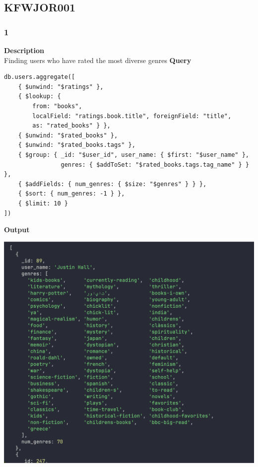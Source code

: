 \documentclass[11pt]{article}
\begin{document}
\subsection{KFWJOR001}
\label{sec:orgddd99c3}
\subsubsection{1}
\label{sec:orgbbf3a5b}
\textbf{Description}\\
Finding users who have rated the most diverse genres
\linebreak
\textbf{Query}
\begin{verbatim}
db.users.aggregate([
    { $unwind: "$ratings" },
    { $lookup: {
        from: "books",
        localField: "ratings.book.title", foreignField: "title",
        as: "rated_books" } },
    { $unwind: "$rated_books" },
    { $unwind: "$rated_books.tags" },
    { $group: { _id: "$user_id", user_name: { $first: "$user_name" },
                genres: { $addToSet: "$rated_books.tags.tag_name" } } },
    { $addFields: { num_genres: { $size: "$genres" } } },
    { $sort: { num_genres: -1 } },
    { $limit: 10 }
])
\end{verbatim}

\linebreak
\textbf{Output}\\
\begin{center}
\includegraphics[width=1\textwidth]{images/KFWJOR001/1.png}
\end{center}
\pagebreak
\end{document}
